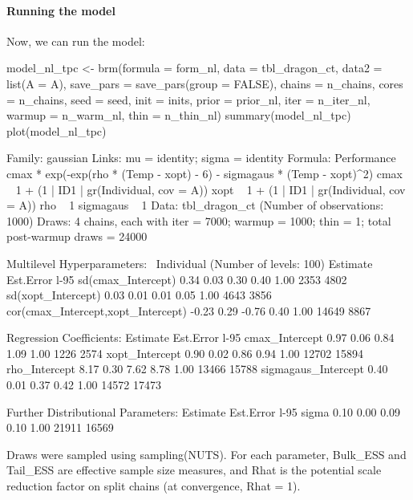 \documentclass[a4paper,12pt,twoside]{article}
\begin{document}
\paragraph{Running the model}
Now, we can run the model:
\begin{Rinput}
model_nl_tpc <-
    brm(formula   = form_nl,
        data      = tbl_dragon_ct,
        data2     = list(A = A),
        save_pars = save_pars(group = FALSE),
        chains    = n_chains,
        cores     = n_chains,
        seed      = seed,
        init      = inits,
        prior     = prior_nl,
        iter      = n_iter_nl,
        warmup    = n_warm_nl,
        thin      = n_thin_nl)
summary(model_nl_tpc)
plot(model_nl_tpc)
\end{Rinput}
\begin{Routput}
 Family: gaussian 
  Links: mu = identity; sigma = identity 
Formula: Performance ~ cmax * exp(-exp(rho * (Temp - xopt) - 6) - sigmagaus * (Temp - xopt)^2) 
         cmax ~ 1 + (1 | ID1 | gr(Individual, cov = A))
         xopt ~ 1 + (1 | ID1 | gr(Individual, cov = A))
         rho ~ 1
         sigmagaus ~ 1
   Data: tbl_dragon_ct (Number of observations: 1000) 
  Draws: 4 chains, each with iter = 7000; warmup = 1000; thin = 1;
         total post-warmup draws = 24000

Multilevel Hyperparameters:
~Individual (Number of levels: 100) 
                                   Estimate Est.Error l-95%
sd(cmax_Intercept)                     0.34      0.03     0.30     0.40 1.00     2353     4802
sd(xopt_Intercept)                     0.03      0.01     0.01     0.05 1.00     4643     3856
cor(cmax_Intercept,xopt_Intercept)    -0.23      0.29    -0.76     0.40 1.00    14649     8867

Regression Coefficients:
                    Estimate Est.Error l-95%
cmax_Intercept          0.97      0.06     0.84     1.09 1.00     1226     2574
xopt_Intercept          0.90      0.02     0.86     0.94 1.00    12702    15894
rho_Intercept           8.17      0.30     7.62     8.78 1.00    13466    15788
sigmagaus_Intercept     0.40      0.01     0.37     0.42 1.00    14572    17473

Further Distributional Parameters:
      Estimate Est.Error l-95%
sigma     0.10      0.00     0.09     0.10 1.00    21911    16569

Draws were sampled using sampling(NUTS). For each parameter, Bulk_ESS
and Tail_ESS are effective sample size measures, and Rhat is the potential
scale reduction factor on split chains (at convergence, Rhat = 1).
\end{Routput}
\end{document}
